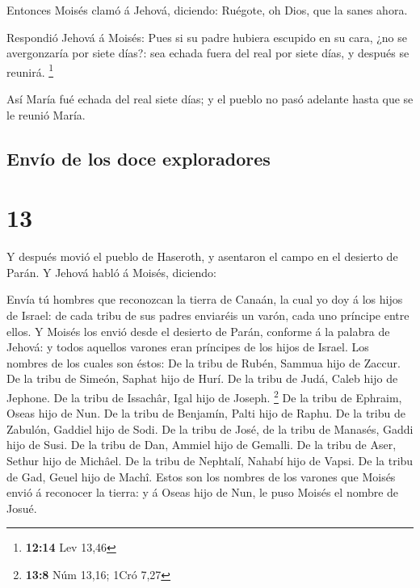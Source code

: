  Entonces Moisés clamó á Jehová, diciendo: Ruégote, oh
Dios, que la sanes ahora.

 Respondió Jehová á Moisés: Pues si su padre hubiera
escupido en su cara, ¿no se avergonzaría por siete días?: sea echada
fuera del real por siete días, y después se reunirá. \footnote{\textbf{12:14}
  Lev 13,46}

 Así María fué echada del real siete días; y el pueblo no
pasó adelante hasta que se le reunió María. 

\hypertarget{envuxedo-de-los-doce-exploradores}{%
\subsection{Envío de los doce
exploradores}\label{envuxedo-de-los-doce-exploradores}}

\hypertarget{section-12}{%
\section{13}\label{section-12}}

 Y después movió el pueblo de Haseroth, y asentaron el campo
en el desierto de Parán.  Y Jehová habló á Moisés, diciendo:

 Envía tú hombres que reconozcan la tierra de Canaán, la
cual yo doy á los hijos de Israel: de cada tribu de sus padres enviaréis
un varón, cada uno príncipe entre ellos.  Y Moisés los envió
desde el desierto de Parán, conforme á la palabra de Jehová: y todos
aquellos varones eran príncipes de los hijos de Israel.  Los
nombres de los cuales son éstos: De la tribu de Rubén, Sammua hijo de
Zaccur.  De la tribu de Simeón, Saphat hijo de Hurí.
 De la tribu de Judá, Caleb hijo de Jephone.  De
la tribu de Issachâr, Igal hijo de Joseph. \footnote{\textbf{13:8} Núm
  13,16; 1Cró 7,27}  De la tribu de Ephraim, Oseas hijo de
Nun.  De la tribu de Benjamín, Palti hijo de Raphu.
 De la tribu de Zabulón, Gaddiel hijo de Sodi.
 De la tribu de José, de la tribu de Manasés, Gaddi hijo de
Susi.  De la tribu de Dan, Ammiel hijo de Gemalli.
 De la tribu de Aser, Sethur hijo de Michâel. 
De la tribu de Nephtalí, Nahabí hijo de Vapsi.  De la tribu
de Gad, Geuel hijo de Machî.  Estos son los nombres de los
varones que Moisés envió á reconocer la tierra: y á Oseas hijo de Nun,
le puso Moisés el nombre de Josué.

